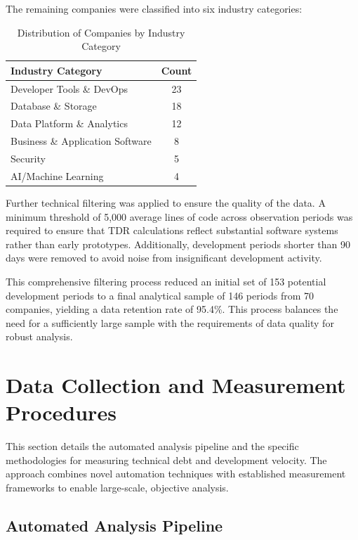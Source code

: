 The remaining companies were classified into six industry categories: 

\begin{table}[h]
\centering
\caption{Distribution of Companies by Industry Category}
\label{tab:industry_distribution}
\begin{tabular}{lc}
\hline
\textbf{Industry Category} & \textbf{Count} \\
\hline
Developer Tools \& DevOps & 23 \\
Database \& Storage & 18 \\
Data Platform \& Analytics & 12 \\
Business \& Application Software & 8 \\
Security & 5 \\
AI/Machine Learning & 4 \\
\hline
\end{tabular}
\end{table}

Further technical filtering was applied to ensure the quality of the data. A minimum threshold of 5,000 average lines of code across observation periods was required to ensure that \ac{TDR} calculations reflect substantial software systems rather than early prototypes. Additionally, development periods shorter than 90 days were removed to avoid noise from insignificant development activity.

This comprehensive filtering process reduced an initial set of 153 potential development periods to a final analytical sample of 146 periods from 70 companies, yielding a data retention rate of 95.4\%. This process balances the need for a sufficiently large sample with the requirements of data quality for robust analysis.

\section{Data Collection and Measurement Procedures}\label{sec:data_collection}

This section details the automated analysis pipeline and the specific methodologies for measuring technical debt and development velocity. The approach combines novel automation techniques with established measurement frameworks to enable large-scale, objective analysis.

\subsection{Automated Analysis Pipeline}\label{sec:analysis_pipeline}

